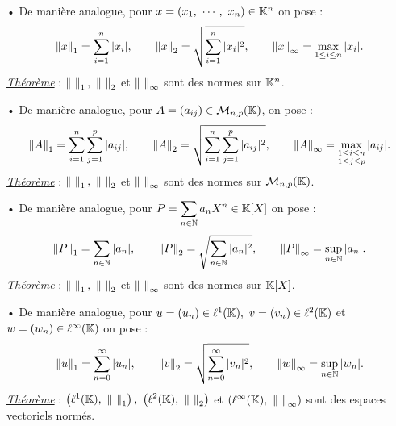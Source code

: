 \vspace{1cm}

• De manière analogue, pour \(x=(x_1,\ \cdots,\ x_n)\in \KK ^n\) on pose :\vspace{-0.2cm}
\[\left\lVert x\right\rVert_1 = \sum_{i=1}^n |x_i|, \qquad \left\lVert x\right\rVert_2 = \sqrt{\sum_{i=1}^n |x_i|^2}, \qquad \left\lVert x\right\rVert_{\infty} = \max _{1\leq i\leq n} |x_i|. \]
\underline{\emph{Théorème}} : \(\left\lVert\ \right\rVert_1,\ \left\lVert\ \right\rVert_2\) et \(\left\lVert\ \right\rVert_{\infty}\) sont des normes sur \(\mathbb{K} ^n\).

\vspace{1cm}

• De manière analogue, pour \(A=(a_{ij})\in \mathcal{M}_{n,p}(\mathbb{K})\), on pose :\vspace{-0.2cm}
\[\left\lVert A\right\rVert_1= \sum_{i=1}^n\sum_{j=1}^p |a_{ij}|, \qquad \left\lVert A\right\rVert_2= \sqrt{\sum_{i=1}^n\sum_{j=1}^p |a_{ij}|^2}, \qquad \left\lVert A\right\rVert_\infty = \max _{\substack{1\leq i\leq n \\ 1\leq j\leq p}} |a_{ij}|. \]
\underline{\emph{Théorème}} : \(\left\lVert\ \right\rVert_1,\ \left\lVert\ \right\rVert_2\) et \(\left\lVert\ \right\rVert_{\infty}\) sont des normes sur \(\mathcal{M}_{n,p}(\mathbb{K})\).

\vspace{1cm}

• De manière analogue, pour \(\displaystyle P=\sum_{n\in \mathbb{N}} a_nX^n \in \mathbb{K}[X] \) on pose :\vspace{-0.2cm}
\[\left\lVert P\right\rVert_1 = \sum_{n\in \mathbb{N}} |a_n|, \qquad \left\lVert P\right\rVert_2 = \sqrt{\sum_{n\in \mathbb{N}} |a_n|^2}, \qquad \left\lVert P\right\rVert_{\infty} = \sup _{n\in \mathbb{N}} |a_n|. \]
\underline{\emph{Théorème}} : \(\left\lVert\ \right\rVert_1,\ \left\lVert\ \right\rVert_2\) et \(\left\lVert\ \right\rVert_{\infty}\) sont des normes sur \(\mathbb{K}[X]\).

\vspace{1cm}

• De manière analogue, pour \(u=(u_n)\in \ell^1(\mathbb{K}),\ v=(v_n)\in \ell^2(\mathbb{K})\) et \(w=(w_n)\in \ell^\infty(\mathbb{K})\) on pose :\vspace{-0.2cm}
\[\left\lVert u\right\rVert_1 = \sum_{n=0}^\infty |u_n|, \qquad \left\lVert v\right\rVert_2 = \sqrt{\sum_{n=0}^\infty |v_n|^2}, \qquad \left\lVert w\right\rVert_{\infty} = \sup _{n\in \mathbb{N}} |w_n|. \]
\underline{\emph{Théorème}} : \(\displaystyle \left( \ell^1(\mathbb{K}),\ \left\lVert\ \right\rVert_1 \right) ,\ \left( \ell^2(\mathbb{K}),\ \left\lVert\ \right\rVert_2 \right) \) et \(\displaystyle \left( \ell^\infty(\KK),\ \norm{\ }_\infty \right) \) sont des espaces vectoriels normés.

\vspace{1cm}

